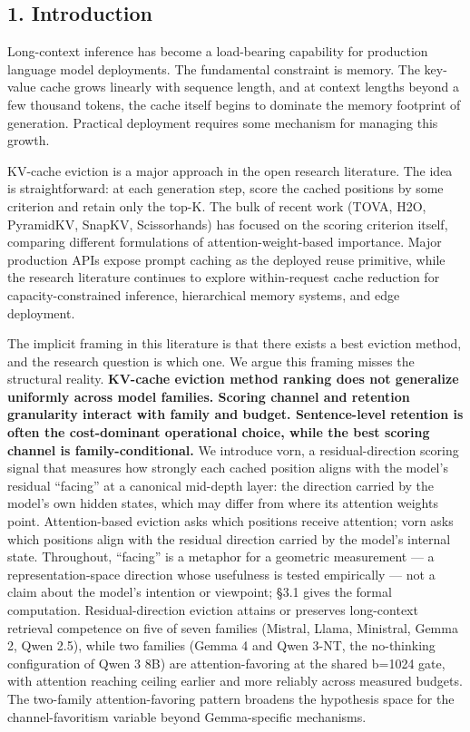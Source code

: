 \documentclass[
]{article}
\begin{document}
\subsection{1. Introduction}\label{1-introduction}

Long-context inference has become a load-bearing capability for
production language model deployments. The fundamental constraint is
memory. The key-value cache grows linearly with sequence length, and at
context lengths beyond a few thousand tokens, the cache itself begins to
dominate the memory footprint of generation. Practical deployment
requires some mechanism for managing this growth.

KV-cache eviction is a major approach in the open research literature.
The idea is straightforward: at each generation step, score the cached
positions by some criterion and retain only the top-K. The bulk of
recent work (TOVA, H2O, PyramidKV, SnapKV, Scissorhands) has focused on
the scoring criterion itself, comparing different formulations of
attention-weight-based importance. Major production APIs expose prompt
caching as the deployed reuse primitive, while the research literature
continues to explore within-request cache reduction for
capacity-constrained inference, hierarchical memory systems, and edge
deployment.

The implicit framing in this literature is that there exists a best
eviction method, and the research question is which one. We argue this
framing misses the structural reality. \textbf{KV-cache eviction
method ranking does not generalize uniformly across model families.
Scoring channel and retention granularity interact with family and
budget. Sentence-level retention is often the cost-dominant
operational choice, while the best scoring channel is
family-conditional.} We introduce vorn, a residual-direction scoring
signal that measures how strongly each cached position aligns with the
model's residual ``facing'' at a canonical mid-depth layer: the
direction carried by the model's own hidden states, which may differ
from where its attention weights point. Attention-based eviction asks
which positions receive attention; vorn asks which positions align
with the residual direction carried by the model's internal state.
Throughout, ``facing'' is a metaphor for a geometric measurement --- a
representation-space direction whose usefulness is tested empirically
--- not a claim about the model's intention or viewpoint; §3.1 gives
the formal computation. Residual-direction eviction
attains or preserves long-context retrieval competence on five of seven
families (Mistral, Llama, Ministral, Gemma 2, Qwen 2.5), while two
families (Gemma 4 and Qwen 3-NT, the no-thinking configuration of
Qwen 3 8B) are attention-favoring at the shared b=1024 gate, with
attention reaching ceiling earlier and more reliably across measured
budgets. The two-family attention-favoring pattern broadens the
hypothesis space for the channel-favoritism variable beyond
Gemma-specific mechanisms.
\end{document}

